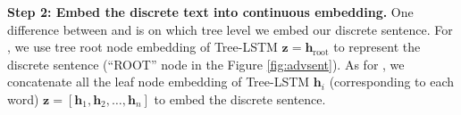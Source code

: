 \textbf{Step 2: Embed the discrete text into continuous embedding.} One difference between \advcodecsent and \advcodecword is on which tree level we embed our discrete sentence. For \advcodecsent, we use tree root node embedding of Tree-LSTM $\boldsymbol{z} = \boldsymbol{h}_\text{root}$ to represent the discrete sentence (``ROOT'' node in the Figure \ref{fig:advsent}). As for \advcodecword, we concatenate all the leaf node embedding of Tree-LSTM $\boldsymbol{h}_i$ (corresponding to each word) $\boldsymbol{z} = [\boldsymbol{h}_1, \boldsymbol{h}_2, \dots, \boldsymbol{h}_n]$ to embed the discrete sentence.




